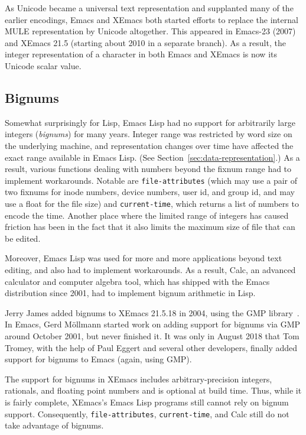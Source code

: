 \documentclass[format=acmsmall, review]{acmart}
\newcommand \Elisp {Emacs Lisp}
\begin{document}
As Unicode became a universal text representation and supplanted many
of the earlier encodings, Emacs and XEmacs both started efforts to
replace the internal MULE representation by Unicode altogether.  This
appeared in Emacs-23 (2007) and XEmacs 21.5 (starting about 2010 in a
separate branch).  As a result, the integer representation of a
character in both Emacs and XEmacs is now its Unicode scalar value.


\subsection{Bignums}

Somewhat surprisingly for Lisp, \Elisp{} had no support for
arbitrarily large integers (\emph{bignums}) for many years.
Integer range was restricted by word size on the underlying machine,
and representation changes over time have affected the exact range
available in \Elisp.  (See Section~\ref{sec:data-representation}.)
As a result, various functions dealing with numbers beyond the fixnum range
had to implement workarounds.  Notable are \texttt{file-attributes} (which
may use a pair of two fixnums for inode numbers, device numbers, user id,
and group id, and may use a float for the file size) and
\texttt{current-time}, which returns a list of numbers to encode the time.
Another place where the limited range of integers has caused friction has
been in the fact that it also limits the maximum size of file that can
be edited.

Moreover, \Elisp{} was used for more and more applications beyond
text editing, and also had to implement workarounds.  As a result,
Calc, an advanced calculator and computer algebra tool, which has
shipped with the Emacs distribution since 2001, had to implement
bignum arithmetic in Lisp.

Jerry James added bignums to XEmacs 21.5.18 in 2004, using the GMP
library~\cite{GMP}.  In Emacs, Gerd Möllmann started work on adding support
for bignums via GMP around October 2001, but never finished it.  It was only
in August 2018 that Tom Tromey, with the help of Paul Eggert and several
other developers, finally added support for bignums to Emacs (again, using
GMP).

The support for bignums in XEmacs includes arbitrary-precision integers,
rationals, and floating point numbers and is optional at build time. Thus,
while it is fairly complete, XEmacs's \Elisp{} programs still cannot rely on
bignum support.  Consequently, \texttt{file-attributes},
\texttt{current-time}, and Calc still do not take advantage of bignums.
\end{document}

